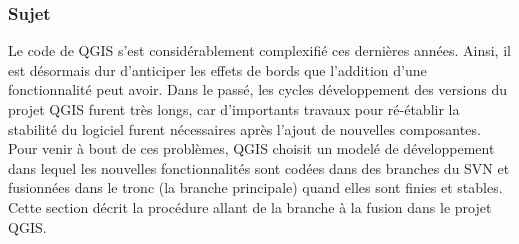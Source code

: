 \subsubsection{Sujet}

Le code de QGIS s'est consid\'erablement complexifi\'e ces derni\`eres ann\'ees. Ainsi, il est d\'esormais dur d'anticiper les effets de bords que l'addition d'une fonctionnalit\'e peut avoir. Dans le pass\'e, les cycles d\'eveloppement des versions du projet QGIS furent tr\`es longs, car d'importants travaux pour r\'e-\'etablir la stabilit\'e du logiciel furent n\'ecessaires apr\`es l'ajout de nouvelles composantes. Pour venir \`a bout de ces probl\`emes, QGIS choisit un model\'e de d\'eveloppement dans lequel les nouvelles fonctionnalit\'es sont cod\'ees dans des branches du SVN et fusionn\'ees dans le tronc (la branche principale) quand elles sont finies et stables. Cette section d\'ecrit la proc\'edure allant de la branche \`a la fusion dans le projet QGIS. 

